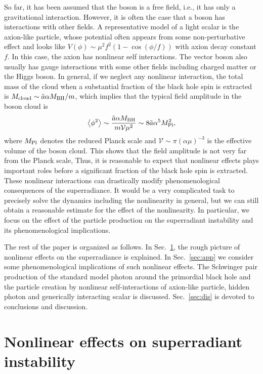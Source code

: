 \documentclass[%
 preprint,
 nofootinbib,
 amsmath,amssymb,
 aps,
 a4paper
]{revtex4-1}
\begin{document}
So far, it has been assumed that the boson is a free field, i.e., it has only a gravitational interaction. However, it is often the case that a boson has interactions with other fields.
A representative model of a light scalar is the axion-like particle, whose potential often appears from some non-perturbative effect and looks like $V(\phi) \sim \mu^2f^2(1-\cos(\phi/f))$ with axion decay constant $f$. In this case, the axion has nonlinear self interactions.
The vector boson also usually has gauge interactions with some other fields including charged matter or the Higgs boson.
In general, if we neglect any nonlinear interaction, the total mass of the cloud when a substantial fraction of the black hole spin is extracted is $M_{\rm cloud} \sim \tilde a \alpha M_{\rm BH} / m$, which implies that the typical field amplitude in the boson cloud is
\begin{align}
\left<\phi^2\right> \sim \frac{\tilde a \alpha M_{\rm BH}}{m \mathcal V \mu^2} \sim 8 \tilde a \alpha^5 M_{\rm Pl}^2,
\end{align}
where $M_{\rm Pl}$ denotes the reduced Planck scale and $\mathcal V \sim \pi (\alpha \mu)^{-3}$ is the effective volume of the boson cloud. This shows that the field amplitude is not very far from the Planck scale, Thus, it is reasonable to expect that nonlinear effects plays important roles before a significant fraction of the black hole spin is extracted.
These nonlinear interactions can drastically modify phenomenological consequences of the superradiance.
It would be a very complicated task to precisely solve the dynamics including the nonlinearity in general, but we can still obtain a reasonable estimate for the effect of the nonlinearity.
In particular, we focus on the effect of the particle production on the superradiant instability and its phenomenological implications.


The rest of the paper is organized as follows.
In Sec.~\ref{sec:nonlinear}, the rough picture of nonlinear effects on the superradiance is explained. 
In Sec.~\ref{sec:app} we consider some phenomenological implications of such nonlinear effects. The Schwinger pair production of the standard model photon around the primordial black hole and the particle creation by nonlinear self-interactions of axion-like particle, hidden photon and generically interacting scalar is discussed.
Sec.~\ref{sec:dis} is devoted to conclusions and discussion.



\section{Nonlinear effects on superradiant instability}   \label{sec:nonlinear}
\end{document}
